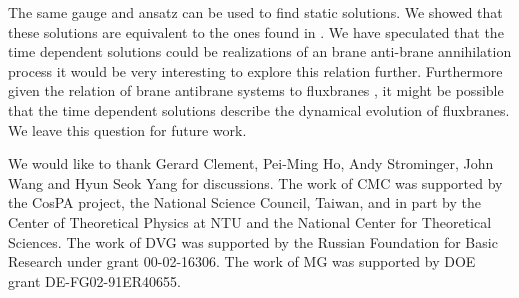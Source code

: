 \documentclass[a4paper,aps,nofootinbib,showpacs,preprint]{revtex4}
\begin{document}
The same gauge and ansatz can be used to find static solutions. We
showed that these solutions are equivalent to the ones found in
\cite{ZZ99,BMO01}. We have speculated that the time dependent
solutions could be realizations of an brane anti-brane
annihilation process it would be very interesting to explore this
relation further. Furthermore given the relation of brane
antibrane systems to fluxbranes \cite{Me64,GM88,GW87,DGGH95,Ts95,
DGGH96,RuTs96,CG00,CGS99,Sa01,GS01,CHC01,CGS02,Iv02}, it might be
possible that the time dependent solutions describe the dynamical
evolution of fluxbranes. We leave this question for future work.


\begin{acknowledgments}
We would like to thank Gerard Clement, Pei-Ming Ho, Andy
Strominger, John Wang and Hyun Seok Yang for discussions. The
work of CMC was supported by the CosPA project, the National
Science Council, Taiwan, and in part by the Center of Theoretical
Physics at NTU and the National Center for Theoretical Sciences.
The work of DVG was supported by the Russian Foundation for Basic
Research under grant 00-02-16306. The work of MG was supported by
DOE grant DE-FG02-91ER40655.
\end{acknowledgments}
\end{document}
